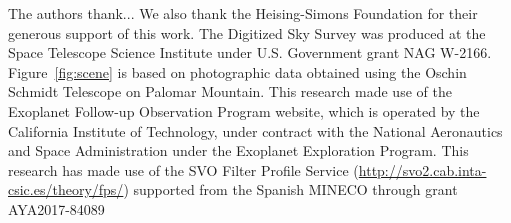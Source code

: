\documentclass[12pt,twocolumn,tighten]{aastex62}
\begin{document}
\acknowledgements
%
%
%
The authors thank...
%
We also thank the Heising-Simons Foundation for
their generous support of this work.
%
The Digitized Sky Survey was produced at the Space Telescope Science
Institute under U.S. Government grant NAG W-2166.
Figure~\ref{fig:scene} is based on photographic data obtained using
the Oschin Schmidt Telescope on Palomar Mountain.
%
This research made use of the Exoplanet Follow-up Observation
Program website, which is operated by the California Institute of
Technology, under contract with the National Aeronautics and Space
Administration under the Exoplanet Exploration Program.
%
This research has made use of the SVO Filter Profile Service
(\url{http://svo2.cab.inta-csic.es/theory/fps/}) supported from the Spanish
MINECO through grant AYA2017-84089
%
%
%
%
\end{document}
